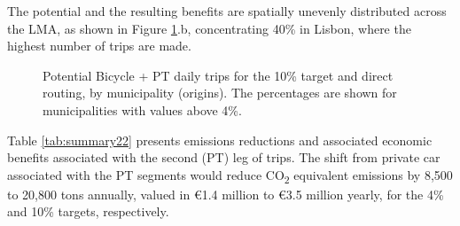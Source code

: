 \documentclass[review, doubleblind, 3p,
authoryear]{elsarticle} %
\providecommand{\DIFaddbeginFL}{} %
\providecommand{\DIFaddendFL}{} %
\providecommand{\DIFdelbeginFL}{} %
\providecommand{\DIFdelendFL}{} %
\newcommand{\DIFscaledelfig}{0.5}
\newlength{\DIFdelgraphicswidth} %
\newlength{\DIFdelgraphicsheight} %
\newcommand{\DIFaddincludegraphics}[2][]{{\color{blue}\fbox{\DIFOincludegraphics[#1]{#2}}}} %
\newcommand{\DIFdelincludegraphics}[2][]{%
\sbox{\DIFdelgraphicsbox}{\DIFOincludegraphics[#1]{#2}}%
\settoboxwidth{\DIFdelgraphicswidth}{\DIFdelgraphicsbox} %
\settoboxtotalheight{\DIFdelgraphicsheight}{\DIFdelgraphicsbox} %
\scalebox{\DIFscaledelfig}{%
\parbox[b]{\DIFdelgraphicswidth}{\usebox{\DIFdelgraphicsbox}\\[-\baselineskip] \rule{\DIFdelgraphicswidth}{0em}}\llap{\resizebox{\DIFdelgraphicswidth}{\DIFdelgraphicsheight}{%
\setlength{\unitlength}{\DIFdelgraphicswidth}%
\begin{picture}(1,1)%
\thicklines\linethickness{2pt} %
{\color[rgb]{1,0,0}\put(0,0){\framebox(1,1){}}}%
{\color[rgb]{1,0,0}\put(0,0){\line( 1,1){1}}}%
{\color[rgb]{1,0,0}\put(0,1){\line(1,-1){1}}}%
\end{picture}%
}\hspace*{3pt}}} %
} %
\DeclareRobustCommand{\DIFaddbeginFL}{\DIFOaddbeginFL \let\includegraphics\DIFaddincludegraphics} %
\DeclareRobustCommand{\DIFaddendFL}{\DIFOaddendFL \let\includegraphics\DIFOincludegraphics} %
\DeclareRobustCommand{\DIFdelbeginFL}{\DIFOdelbeginFL \let\includegraphics\DIFdelincludegraphics} %
\DeclareRobustCommand{\DIFdelendFL}{\DIFOaddendFL \let\includegraphics\DIFOincludegraphics} %
\begin{document}
The potential and the resulting benefits are spatially unevenly
distributed across the LMA, as shown in Figure \ref{fig:mapzones}.b,
concentrating 40\% in Lisbon, where the highest number of trips are
made.

\begin{figure}
\DIFdelbeginFL %
\DIFdelendFL \DIFaddbeginFL {}\DIFaddendFL \caption{\label{mapzones}Potential Bicycle + PT daily trips for the 10\% target and direct routing, by municipality (origins). The percentages are shown for municipalities with values above 4\%.}\label{fig:mapzones}
\end{figure}

Table \ref{tab:summary22} presents emissions reductions and associated
economic benefits associated with the second (PT) leg of trips. The
shift from private car associated with the PT segments would reduce
CO\textsubscript{2} equivalent emissions by 8,500 to 20,800 tons
annually, valued in €1.4 million to €3.5 million yearly, for the 4\% and
10\% targets, respectively.
\end{document}
